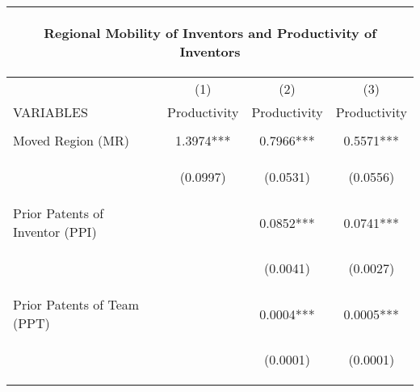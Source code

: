 \begin{center}
\begin{tabular}{lccc}
\multicolumn{4}{c}{\begin{large}Regional Mobility of Inventors and Productivity of Inventors\end{large}} \\ \hline
 & (1) & (2) & (3) \\
VARIABLES & Productivity & Productivity & Productivity \\ \hline
\vspace{4pt} & \begin{footnotesize}\end{footnotesize} & \begin{footnotesize}\end{footnotesize} & \begin{footnotesize}\end{footnotesize} \\
Moved Region (MR) & 1.3974*** & 0.7966*** & 0.5571*** \\
\vspace{4pt} & \begin{footnotesize}(0.0997)\end{footnotesize} & \begin{footnotesize}(0.0531)\end{footnotesize} & \begin{footnotesize}(0.0556)\end{footnotesize} \\
Prior Patents of Inventor (PPI) &  & 0.0852*** & 0.0741*** \\
\vspace{4pt} & \begin{footnotesize}\end{footnotesize} & \begin{footnotesize}(0.0041)\end{footnotesize} & \begin{footnotesize}(0.0027)\end{footnotesize} \\
Prior Patents of Team (PPT) &  & 0.0004*** & 0.0005*** \\
\vspace{4pt} & \begin{footnotesize}\end{footnotesize} & \begin{footnotesize}(0.0001)\end{footnotesize} & \begin{footnotesize}(0.0001)\end{footnotesize} \\

\end{tabular}
\end{center}
